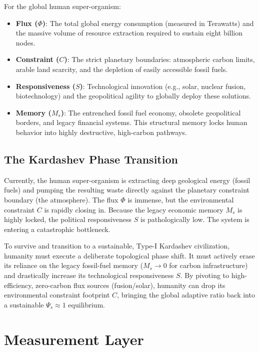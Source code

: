 \documentclass[11pt,a4paper]{article}
\begin{document}
For the global human super-organism:
\begin{itemize}
    \item \textbf{Flux ($\Phi$)}: The total global energy consumption (measured in Terawatts) and the massive volume of resource extraction required to sustain eight billion nodes.
    \item \textbf{Constraint ($C$)}: The strict planetary boundaries: atmospheric carbon limits, arable land scarcity, and the depletion of easily accessible fossil fuels.
    \item \textbf{Responsiveness ($S$)}: Technological innovation (e.g., solar, nuclear fusion, biotechnology) and the geopolitical agility to globally deploy these solutions.
    \item \textbf{Memory ($M_s$)}: The entrenched fossil fuel economy, obsolete geopolitical borders, and legacy financial systems. This structural memory locks human behavior into highly destructive, high-carbon pathways.
\end{itemize}

\subsection{The Kardashev Phase Transition}
Currently, the human super-organism is extracting deep geological energy (fossil fuels) and pumping the resulting waste directly against the planetary constraint boundary (the atmosphere). The flux $\Phi$ is immense, but the environmental constraint $C$ is rapidly closing in. Because the legacy economic memory $M_s$ is highly locked, the political responsiveness $S$ is pathologically low. The system is entering a catastrophic bottleneck.

To survive and transition to a sustainable, Type-I Kardashev civilization, humanity must execute a deliberate topological phase shift. It must actively erase its reliance on the legacy fossil-fuel memory ($M_s \to 0$ for carbon infrastructure) and drastically increase its technological responsiveness $S$. By pivoting to high-efficiency, zero-carbon flux sources (fusion/solar), humanity can drop its environmental constraint footprint $C$, bringing the global adaptive ratio back into a sustainable $\Psi_s \approx 1$ equilibrium.



\section{Measurement Layer}
\end{document}
